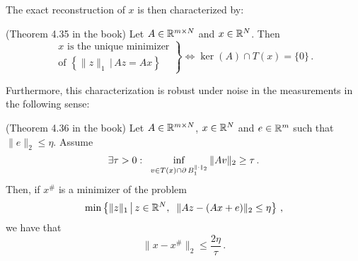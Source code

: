 \documentclass[a4paper]{article}
\begin{document}
The exact reconstruction of \(x\) is then characterized by:
\begin{Satz*}
	{(Theorem 4.35 in the book)}{} Let \(A\in \mathbb R^{m\times N }\) and \(x\in \mathbb R^N \). Then
	\[
	\left.\begin{array}{c}

		x\text{ is the unique minimizer} \\  \text{of }
		\left\{\|z\|_1\,\big|\, Az=Ax\right\}
	\end{array}\right\} \iff \ker(A)\cap T(x)=\{0\}\,.
	\]
\end{Satz*}

Furthermore, this characterization is robust under noise in the measurements in the following sense:
\begin{Satz*}
{(Theorem 4.36 in the book)}{} Let \(A\in \mathbb R^{m\times N}\), \(x\in \mathbb R^N\) and \(e\in \mathbb R^m \) such that \(\|e\|_2\le \eta\). Assume
\[\exists \tau>0:\;\;\inf_{v\in T(x)\cap \operatorname{\partial} B_1^{\|\cdot\|_2}}\|Av\|_2\ge \tau\,.\]
Then, if \(x^{\#}\) is a minimizer of the problem
\[\min\left\{\|z\|_1\,\big|\,z\in \mathbb R^N,\;\;\|Az-(Ax+e)\|_2\le \eta\right\}\,,\]
we have that
\[\|x-x^{\#}\|_2\le \frac{2\eta}{\tau}\,.\]
	\end{Satz*}	

    
 
\end{document}
